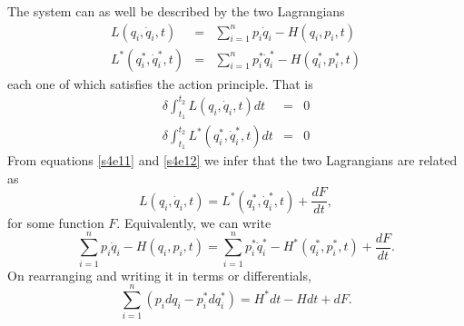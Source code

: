 \documentclass{article}
\numberwithin{equation}{section}
\theoremstyle{plain}
\numberwithin{thm}{section}
\theoremstyle{plain}
\numberwithin{prop}{section}
\theoremstyle{definition}
\numberwithin{defn}{section}
\theoremstyle{remark}
\begin{document}
The system can as well be described by the two Lagrangians
\begin{eqnarray}
L(q_i, \dot{q}_i, t) &=& \sum_{i=1}^n p_i\dot{q}_i - H(q_i, p_i, t)
\label{s4e9} \\
L^\ast(q^\ast_i, \dot{q}^\ast_i, t) &=& \sum_{i=1}^n p^\ast_i\dot{q}^\ast_i - 
H(q^\ast_i, p^\ast_i, t) \label{s4e10}
\end{eqnarray}
each one of which satisfies the action principle. That is
\begin{eqnarray}
\delta\int_{t_1}^{t_2} L(q_i, \dot{q}_i, t)dt &=& 0 \label{s4e11} \\
\delta\int_{t_1}^{t_2} L^\ast(q^\ast_i, \dot{q}^\ast_i, t)dt &=& 0 \label{s4e12}
\end{eqnarray}
From equations \eqref{s4e11} and \eqref{s4e12} we infer that the two
Lagrangians are related as
\begin{equation}\label{s4e13}
L(q_i, \dot{q}_i, t) = L^\ast(q^\ast_i, \dot{q}^\ast_i, t) + \frac{dF}{dt},
\end{equation}
for some function $F$. Equivalently, we can write
\begin{equation}\label{s4e14}
\sum_{i=1}^n p_i\dot{q}_i - H(q_i, p_i, t) = 
\sum_{i=1}^n p^\ast_i\dot{q}^\ast_i - H^\ast(q^\ast_i, p^\ast_i, t) +
\frac{dF}{dt}.
\end{equation}
On rearranging and writing it in terms or differentials,
\begin{equation}\label{s4e15}
\sum_{i=1}^n(p_i dq_i - p^\ast_i dq^\ast_i) = H^\ast dt - Hdt + dF.
\end{equation}
\end{document}

